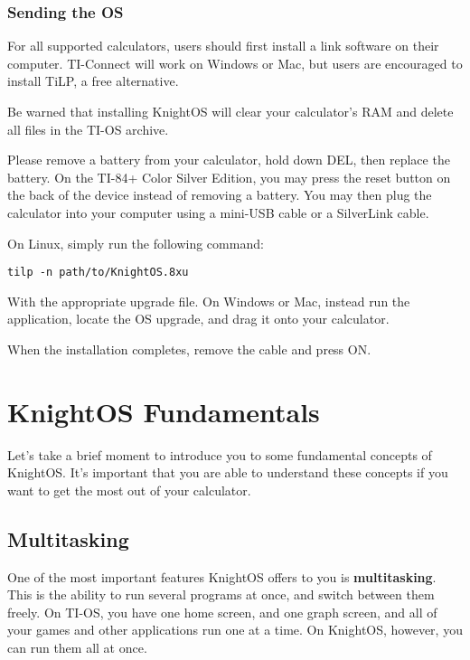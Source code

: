 \subsubsection{Sending the OS}

For all supported calculators, users should first install a link software on their
computer. TI-Connect will work on Windows or Mac, but users are encouraged to
install TiLP, a free alternative.

Be warned that installing KnightOS will clear your calculator's RAM and delete all
files in the TI-OS archive.

Please remove a battery from your calculator, hold down DEL, then replace the
battery. On the TI-84+ Color Silver Edition, you may press the reset button on the
back of the device instead of removing a battery. You may then plug the calculator
into your computer using a mini-USB cable or a SilverLink cable.

On Linux, simply run the following command:

\begin{verbatim}
tilp -n path/to/KnightOS.8xu
\end{verbatim}

With the appropriate upgrade file. On Windows or Mac, instead run the application,
locate the OS upgrade, and drag it onto your calculator.

When the installation completes, remove the cable and press ON.

\section{KnightOS Fundamentals}

Let's take a brief moment to introduce you to some fundamental concepts of
KnightOS. It's important that you are able to understand these concepts if you
want to get the most out of your calculator.

\subsection{Multitasking}

One of the most important features KnightOS offers to you is
\textbf{multitasking}. This is the ability to run several programs at once, and
switch between them freely. On TI-OS, you have one home screen, and one graph
screen, and all of your games and other applications run one at a time. On
KnightOS, however, you can run them all at once.


